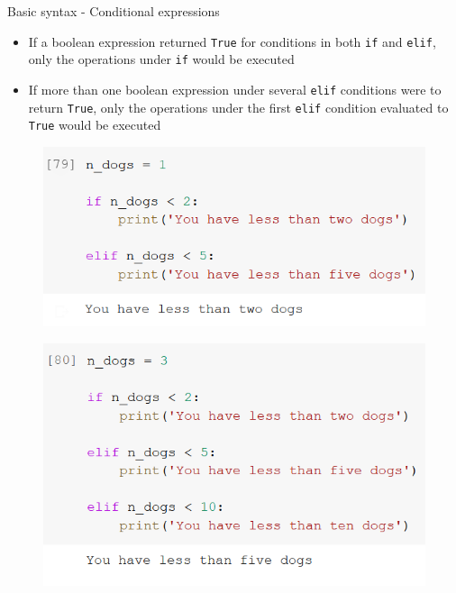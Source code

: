 \documentclass[aspectratio=169]{beamer}
\begin{document}
\begin{frame}{Basic syntax - Conditional expressions}

	\begin{itemize}
		\item If a boolean expression returned \texttt{True} for conditions in both \texttt{if} and \texttt{elif}, only the operations  under \texttt{if} would be executed
		\item If more than one boolean expression under several \texttt{elif} conditions were to return \texttt{True}, only the operations under the first \texttt{elif} condition evaluated to \texttt{True} would be executed
	\end{itemize}

	\begin{multicols}{2}

		\begin{figure}
			\centering
			\includegraphics[width=\linewidth]{img/if_and_elif_true.png}
		\end{figure}
		\begin{figure}
			\centering
			\includegraphics[width=\linewidth]{img/elif_and_elif_true.png}
		\end{figure}

	\end{multicols}

\end{frame}
\end{document}
